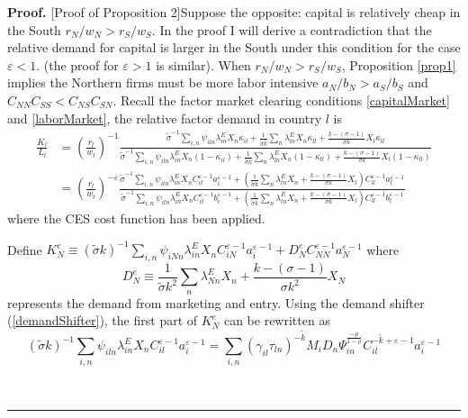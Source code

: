 \documentclass[notitlepage,11pt]{article}%
\newenvironment{proof}[1][Proof]{\noindent \textbf{#1.} }{\  \rule{0.5em}{0.5em}}
\begin{document}
\begin{proof}
[Proof of Proposition 2]Suppose the opposite: capital is relatively cheap in
the South $r_{N}/w_{N}>r_{S}/w_{S}$. In the proof I will derive a
contradiction that the relative demand for capital is larger in the South
under this condition for the case $\varepsilon<1$. (the proof for
$\varepsilon>1$ is similar). \qquad When $r_{N}/w_{N}>r_{S}/w_{S}$,
Proposition \ref{prop1} implies the Northern firms must be more labor
intensive $a_{N}/b_{N}>a_{S}/b_{S}$ and $C_{NN}C_{SS}<C_{NS}C_{SN}$. Recall
the factor market clearing conditions \ref{capitalMarket} and
\ref{laborMarket}, the relative factor demand in country $l$ is%
\begin{align*}
\frac{K_{l}}{L_{l}}  &  =\left(  \frac{r_{l}}{w_{l}}\right)  ^{-1}\frac
{\tilde{\sigma}^{-1}\sum_{i,n}\psi_{iln}\lambda_{in}^{E}X_{n}\kappa_{il}%
+\frac{1}{\tilde{\sigma}k}\sum_{n}\lambda_{ln}^{E}X_{n}\kappa_{ll}%
+\frac{k-\left(  \sigma-1\right)  }{\sigma k}X_{l}\kappa_{ll}}{\tilde{\sigma
}^{-1}\sum_{i,n}\psi_{iln}\lambda_{in}^{E}X_{n}\left(  1-\kappa_{il}\right)
+\frac{1}{\tilde{\sigma}k}\sum_{n}\lambda_{ln}^{E}X_{n}\left(  1-\kappa
_{ll}\right)  +\frac{k-\left(  \sigma-1\right)  }{\sigma k}X_{l}\left(
1-\kappa_{ll}\right)  }\\
&  =\left(  \frac{r_{l}}{w_{l}}\right)  ^{-\varepsilon}\frac{\tilde{\sigma
}^{-1}\sum_{i,n}\psi_{iln}\lambda_{in}^{E}X_{n}C_{il}^{\varepsilon-1}%
a_{i}^{\varepsilon-1}+\left(  \frac{1}{\tilde{\sigma}k}\sum_{n}\lambda
_{ln}^{E}X_{n}+\frac{k-\left(  \sigma-1\right)  }{\sigma k}X_{l}\right)
C_{ll}^{\varepsilon-1}a_{l}^{\varepsilon-1}}{\tilde{\sigma}^{-1}\sum_{i,n}%
\psi_{iln}\lambda_{in}^{E}X_{n}C_{il}^{\varepsilon-1}b_{i}^{\varepsilon
-1}+\left(  \frac{1}{\tilde{\sigma}k}\sum_{n}\lambda_{ln}^{E}X_{n}%
+\frac{k-\left(  \sigma-1\right)  }{\sigma k}X_{l}\right)  C_{ll}%
^{\varepsilon-1}b_{l}^{\varepsilon-1}}%
\end{align*}
where the CES cost function has been applied.

Define $K_{N}^{e}\equiv\left(  \tilde{\sigma}k\right)  ^{-1}\sum_{i,n}%
\psi_{iNn}\lambda_{in}^{E}X_{n}C_{iN}^{\varepsilon-1}a_{i}^{\varepsilon
-1}+D_{N}^{e}C_{NN}^{\varepsilon-1}a_{N}^{\varepsilon-1}$ where%
\[
D_{N}^{e}\equiv\frac{1}{\tilde{\sigma}k^{2}}\sum_{n}\lambda_{Nn}^{E}%
X_{n}+\frac{k-\left(  \sigma-1\right)  }{\sigma k^{2}}X_{N}%
\]
represents the demand from marketing and entry. Using the demand shifter
(\ref{demandShifter}), the first part of $K_{N}^{e}$ can be rewritten as%
\[
\left(  \tilde{\sigma}k\right)  ^{-1}\sum_{i,n}\psi_{iln}\lambda_{in}^{E}%
X_{n}C_{il}^{\varepsilon-1}a_{i}^{\varepsilon-1}=\sum_{i,n}\left(  \gamma
_{il}\tau_{ln}\right)  ^{-\tilde{k}}M_{i}D_{n}\Psi_{in}^{\frac{-\rho}{1-\rho}%
}C_{il}^{-\tilde{k}+\varepsilon-1}a_{i}^{\varepsilon-1}%
\]



\end{proof}
\end{document}
